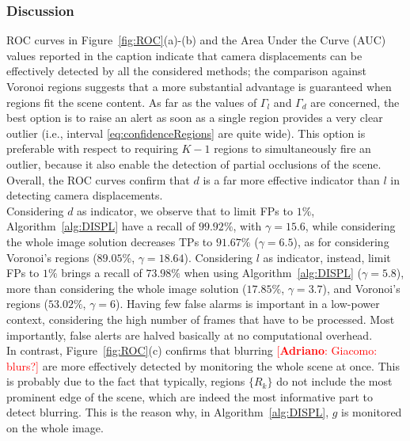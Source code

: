\documentclass{llncs}
\newcommand{\gi}[1]{{\textcolor{red}{[\small \textbf{Giacomo}: #1]}}}
\newcommand{\ad}[1]{{\textcolor{red}{[\small \textbf{Adriano}: #1]}}}
\begin{document}
\subsubsection{Discussion}
ROC curves in Figure~\ref{fig:ROC}(a)-(b) and the Area Under the Curve (AUC) values reported in the caption indicate that camera displacements can be effectively detected by all the considered methods; the comparison against Voronoi regions suggests that a more substantial advantage is guaranteed when regions fit the scene content. As far as the values of $\Gamma_l$ and $\Gamma_d $ are concerned, the best option is to raise an alert as soon as a single region provides a very clear outlier (i.e., interval \eqref{eq:confidenceRegions} are quite wide). This option is preferable with respect to requiring $K-1$ regions to simultaneously fire an outlier, because it also enable the detection of partial occlusions of the scene. Overall, the ROC curves confirm that $d$ is a far more effective indicator than $l$ in detecting camera displacements.\\
Considering $d$ as indicator, we observe that to limit FPs to $1\%$, Algorithm~\ref{alg:DISPL} have a recall of $99.92\%$, with $\gamma = 15.6$, while considering the whole image solution decreases TPs to $91.67\%$ ($\gamma = 6.5$), as for considering Voronoi's regions ($89.05\%$, $\gamma = 18.64$).
Considering $l$ as indicator, instead, limit FPs to $1\%$ brings a recall of $73.98\%$ when using Algorithm~\ref{alg:DISPL} ($\gamma=5.8$), more than considering the whole image solution ($17.85\%$, $\gamma=3.7$), and Voronoi's regions ($53.02\%$, $\gamma=6$).
Having few false alarms is important in a low-power context, considering the high number of frames that have to be processed. Most importantly, false alerts are halved basically at no computational overhead.\\ %
In contrast, Figure~\ref{fig:ROC}(c) confirms that blurring \ad{Giacomo: blurs?} are more effectively detected by monitoring the whole scene at once. This is probably due to the fact that typically, regions $\{R_k\}$ do not include the most prominent edge of the scene, which are indeed the most informative part to detect blurring. This is the reason why, in Algorithm~\ref{alg:DISPL}, $g$ is monitored on the whole image.%
\end{document}
